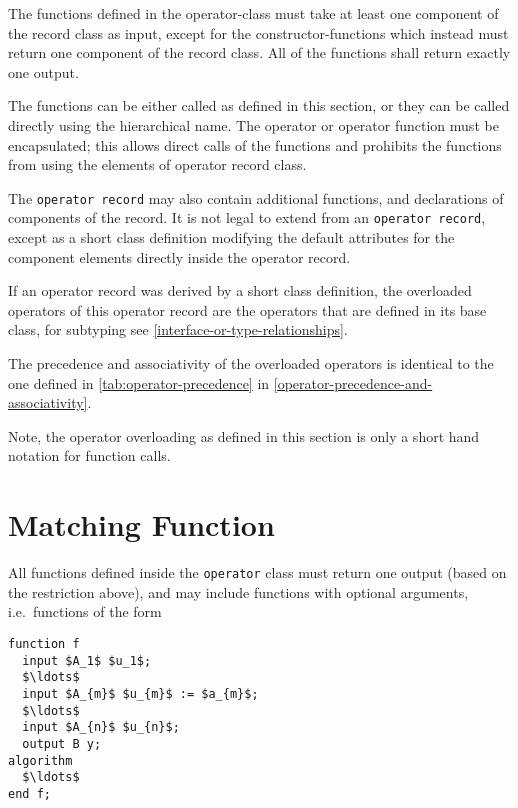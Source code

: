 The functions defined in the operator-class must take at least one component of the record class as input, except for the constructor-functions which instead must return one component of the record class.
All of the functions shall return exactly one output.

The functions can be either called as defined in this section, or they can be called directly using the hierarchical name.
The operator or operator function must be encapsulated; this allows direct calls of the functions and prohibits the functions from using the elements of operator record class.

The \lstinline!operator record! may also contain additional functions, and declarations of components of the record.
It is not legal to extend from an \lstinline!operator record!, except as a short class definition modifying the default attributes for the component elements directly inside the operator record.

If an operator record was derived by a short class definition, the overloaded operators of this operator record are the operators that are defined in its base class, for subtyping see \cref{interface-or-type-relationships}.

The precedence and associativity of the overloaded operators is identical to the one defined in \cref{tab:operator-precedence} in \cref{operator-precedence-and-associativity}.

\begin{nonnormative}
Note, the operator overloading as defined in this section is only a short hand notation for function calls.
\end{nonnormative}

\section{Matching Function}\label{matching-function}

All functions defined inside the \lstinline!operator! class must return one output (based on the restriction above), and may include functions with optional arguments, i.e.\ functions of the form
\begin{lstlisting}[language=modelica]
function f
  input $A_1$ $u_1$;
  $\ldots$
  input $A_{m}$ $u_{m}$ := $a_{m}$;
  $\ldots$
  input $A_{n}$ $u_{n}$;
  output B y;
algorithm
  $\ldots$
end f;
\end{lstlisting}

